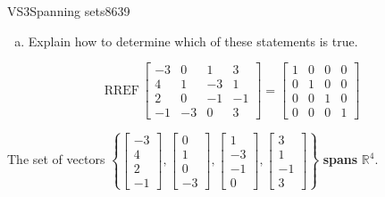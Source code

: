\begin{exercise}{VS3}{Spanning sets}{8639}
\begin{exerciseStatement}
\begin{enumerate}[(a)]
\begin{itemize}
 
\end{itemize}

     
\item  

 Explain how to determine which of these statements is true. 

 
\end{enumerate}

     \end{exerciseStatement}
 \begin{exerciseAnswer} 

 \[
\mathrm{RREF}\, \left[\begin{array}{cccc}
-3 & 0 & 1 & 3 \\
4 & 1 & -3 & 1 \\
2 & 0 & -1 & -1 \\
-1 & -3 & 0 & 3
\end{array}\right] = \left[\begin{array}{cccc}
1 & 0 & 0 & 0 \\
0 & 1 & 0 & 0 \\
0 & 0 & 1 & 0 \\
0 & 0 & 0 & 1
\end{array}\right]
            \] 

 

 The set of vectors \(\left\{ \left[\begin{array}{c}
-3 \\
4 \\
2 \\
-1
\end{array}\right] , \left[\begin{array}{c}
0 \\
1 \\
0 \\
-3
\end{array}\right] , \left[\begin{array}{c}
1 \\
-3 \\
-1 \\
0
\end{array}\right] , \left[\begin{array}{c}
3 \\
1 \\
-1 \\
3
\end{array}\right] \right\}\) \textbf{spans} \(\mathbb{R}^4\). 

 \end{exerciseAnswer}
 \end{exercise}


